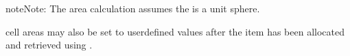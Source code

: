 \documentclass[letterpaper,10pt,english]{sphinxmanual}
\begin{document}
\begin{sphinxadmonition}{note}{Note:}
The {\hyperref[\detokenize{grid:ESMF.api.grid.Grid}]{}} area calculation assumes the {\hyperref[\detokenize{grid:ESMF.api.grid.Grid}]{}} is a unit sphere.
\end{sphinxadmonition}

{\hyperref[\detokenize{grid:ESMF.api.grid.Grid}]{}} cell areas may also be set to user\sphinxhyphen{}defined values
after the {\hyperref[\detokenize{GridItem:ESMF.api.constants.GridItem.AREA}]{}} item has
been allocated and retrieved using {\hyperref[\detokenize{grid:ESMF.api.grid.Grid.get_item}]{}}.
\end{document}
